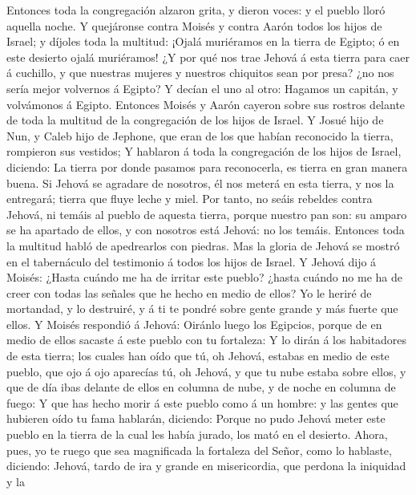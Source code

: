  Entonces toda la congregación alzaron grita, y dieron
voces: y el pueblo lloró aquella noche.  Y quejáronse contra
Moisés y contra Aarón todos los hijos de Israel; y díjoles toda la
multitud: ¡Ojalá muriéramos en la tierra de Egipto; ó en este desierto
ojalá muriéramos!  ¿Y por qué nos trae Jehová á esta tierra
para caer á cuchillo, y que nuestras mujeres y nuestros chiquitos sean
por presa? ¿no nos sería mejor volvernos á Egipto?  Y decían
el uno al otro: Hagamos un capitán, y volvámonos á Egipto. 
Entonces Moisés y Aarón cayeron sobre sus rostros delante de toda la
multitud de la congregación de los hijos de Israel.  Y Josué
hijo de Nun, y Caleb hijo de Jephone, que eran de los que habían
reconocido la tierra, rompieron sus vestidos;  Y hablaron á
toda la congregación de los hijos de Israel, diciendo: La tierra por
donde pasamos para reconocerla, es tierra en gran manera buena.
 Si Jehová se agradare de nosotros, él nos meterá en esta
tierra, y nos la entregará; tierra que fluye leche y miel. 
Por tanto, no seáis rebeldes contra Jehová, ni temáis al pueblo de
aquesta tierra, porque nuestro pan son: su amparo se ha apartado de
ellos, y con nosotros está Jehová: no los temáis.  Entonces
toda la multitud habló de apedrearlos con piedras. Mas la gloria de
Jehová se mostró en el tabernáculo del testimonio á todos los hijos de
Israel.  Y Jehová dijo á Moisés: ¿Hasta cuándo me ha de
irritar este pueblo? ¿hasta cuándo no me ha de creer con todas las
señales que he hecho en medio de ellos?  Yo le heriré de
mortandad, y lo destruiré, y á ti te pondré sobre gente grande y más
fuerte que ellos.  Y Moisés respondió á Jehová: Oiránlo
luego los Egipcios, porque de en medio de ellos sacaste á este pueblo
con tu fortaleza:  Y lo dirán á los habitadores de esta
tierra; los cuales han oído que tú, oh Jehová, estabas en medio de este
pueblo, que ojo á ojo aparecías tú, oh Jehová, y que tu nube estaba
sobre ellos, y que de día ibas delante de ellos en columna de nube, y de
noche en columna de fuego:  Y que has hecho morir á este
pueblo como á un hombre: y las gentes que hubieren oído tu fama
hablarán, diciendo:  Porque no pudo Jehová meter este
pueblo en la tierra de la cual les había jurado, los mató en el
desierto.  Ahora, pues, yo te ruego que sea magnificada la
fortaleza del Señor, como lo hablaste, diciendo:  Jehová,
tardo de ira y grande en misericordia, que perdona la iniquidad y la
